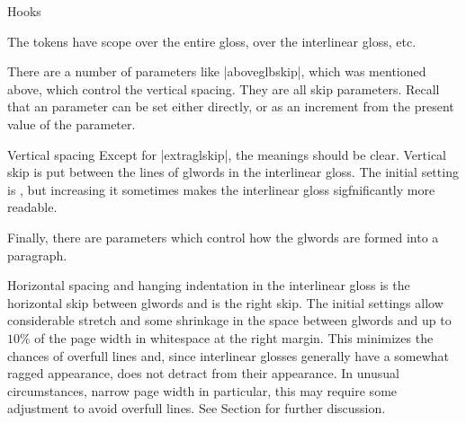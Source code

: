 \ex[dima=2em] Hooks\par
\quad
{}\xe
The tokens  have scope over the entire gloss,
 over the interlinear gloss, etc.

There are a number of parameters like |aboveglbskip|, which was
mentioned above, which control the vertical spacing.  They are all
\inc skip parameters.  Recall that an \inc parameter can be set either
directly, or as an increment from the present value of the parameter.

\ex[dima=2em] Vertical spacing
\smallskip
\quad
{}\xe
Except for |extraglskip|, the meanings should be clear. Vertical skip
 is put between the lines of glwords in the
interlinear gloss.  The initial setting is \textdim{.5 ex}, but
increasing it sometimes makes the interlinear gloss sigfnificantly
more readable.

Finally, there are parameters which control how the glwords are formed
into a paragraph.

\ex[dima=2em] Horizontal spacing and hanging indentation
in the interlinear gloss
\smallskip
\quad
{}\xe
{} is the horizontal skip between
glwords and  is the right skip.  The initial
settings allow considerable stretch and some shrinkage in the space between
glwords and up to $10\%$ of the page width in whitespace at the right
margin.  This minimizes the chances of overfull lines and, since
interlinear glosses generally have a somewhat ragged appearance, does
not detract from their appearance.  In unusual circumstances, narrow
page width in particular, this may require some adjustment to avoid
overfull lines.  See Section  for further
discussion.

